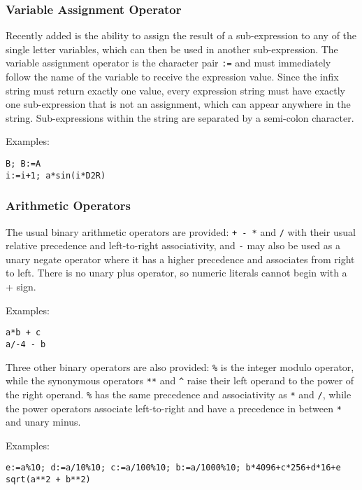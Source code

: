 \subsubsection{Variable Assignment Operator}

Recently added is the ability to assign the result of a sub-expression to any of the single letter variables, which can then be used in another sub-expression.
The variable assignment operator is the character pair \verb|:=| and must immediately follow 
the name of the variable to receive the expression value.
Since the infix string must return exactly one value, every expression string must have exactly one sub-expression that is not an assignment, which can appear anywhere in the string.
Sub-expressions within the string are separated by a semi-colon character.

Examples:

\begin{verbatim}
B; B:=A
i:=i+1; a*sin(i*D2R)
\end{verbatim}

\subsubsection{Arithmetic Operators}

The usual binary arithmetic operators are provided:
\verb|+ - *| and \verb|/| with their usual relative precedence and left-to-right associativity, and \verb|-| may also be used as a unary negate operator where it has a higher precedence and associates from right to left.
There is no unary plus operator, so numeric literals cannot begin with a + sign.

Examples:

\begin{verbatim}
a*b + c
a/-4 - b
\end{verbatim}

Three other binary operators are also provided:
\verb|%| is the integer modulo operator, while the synonymous operators \verb|**| and \verb|^| raise their left operand to the power of the right operand.
\verb|%| has the same precedence and associativity as \verb|*| and \verb|/|, while the power operators associate left-to-right and have a precedence in between \verb|*| and unary minus.

Examples:

\begin{verbatim}
e:=a%10; d:=a/10%10; c:=a/100%10; b:=a/1000%10; b*4096+c*256+d*16+e
sqrt(a**2 + b**2)
\end{verbatim}

